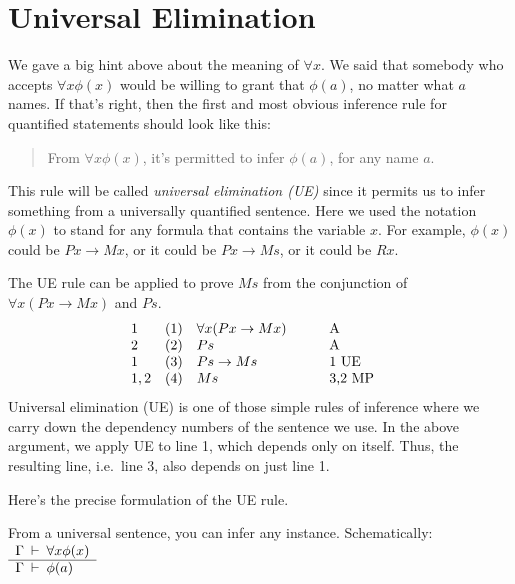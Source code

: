 \section*{Universal Elimination}

We gave a big hint above about the meaning of $\forall x$.  We said
that somebody who accepts $\forall x\phi (x)$ would be willing to
grant that $\phi (a)$, no matter what $a$ names.  If that's right,
then the first and most obvious inference rule for quantified
statements should look like this:
\begin{quote} From $\forall x\phi (x)$, it's permitted to infer
  $\phi (a)$, for any name $a$. \end{quote} This rule will be called
\emph{universal elimination (UE)} since it permits us to infer
something from a universally quantified sentence.  Here we used the
notation $\phi (x)$ to stand for any formula that contains the
variable $x$.  For example, $\phi (x)$ could be $Px\to Mx$, or it
could be $Px\to Ms$, or it could be $Rx$.

The UE rule can be applied to prove $Ms$ from the conjunction of
$\forall x(Px\to Mx)$ and $Ps$.
\[ \begin{array}{l l >{$}p{3cm}<{$} p{1.5cm}}
  1 & (1) & \forall x(Px\to Mx) & A \\
  2 & (2) & Ps & A \\
  1 & (3) & Ps\to Ms & 1 UE \\
  1,2 & (4) & Ms & 3,2 MP \end{array} \]
Universal elimination (UE) is one of those simple rules of inference
where we carry down the dependency numbers of the sentence we use.  In
the above argument, we apply UE to line 1, which depends only on
itself.  Thus, the resulting line, i.e.\ line 3, also depends on just
line 1.

Here's the precise formulation of the UE rule.
\bigskip \begin{tcolorbox}[enhanced,width=10cm,title=Universal Elimination (UE),attach boxed title to top
  left={yshift=-2mm,xshift=4mm},boxed title style={sharp corners}]
From a universal sentence, you can infer any instance.  Schematically:  
$\begin{array}{l l}
     \Gamma\:\vdash\:\forall x\phi (x) \\
     \hline
     \Gamma\:\vdash\:\phi (a) \end{array} $
\end{tcolorbox} \bigskip


